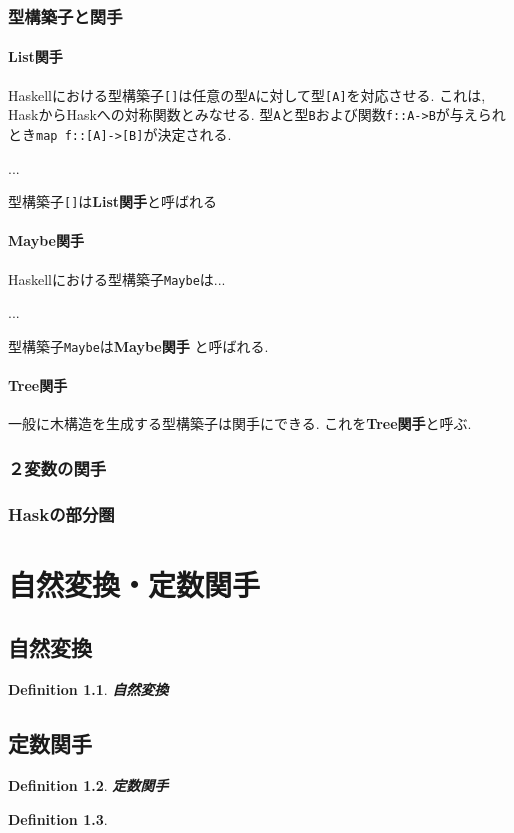 \documentclass{jsbook}
\theoremstyle{plain}
\newtheorem{Def}{Definition}[chapter]
\begin{document}
\subsection{型構築子と関手}
\subsubsection{List関手}
Haskellにおける型構築子\verb|[]|は任意の型\verb|A|に対して型\verb|[A]|を対応させる.
これは, HaskからHaskへの対称関数とみなせる.
型\verb|A|と型\verb|B|および関数\verb|f::A->B|が与えられとき\verb|map f::[A]->[B]|が決定される.

...

型構築子\verb|[]|は{\bf List関手}と呼ばれる
\subsubsection{Maybe関手}
Haskellにおける型構築子\verb|Maybe|は...

...

型構築子\verb|Maybe|は{\bf Maybe関手}
と呼ばれる.
\subsubsection{Tree関手}
一般に木構造を生成する型構築子は関手にできる. これを{\bf Tree関手}と呼ぶ.


\subsection{２変数の関手}
\subsection{Haskの部分圏}
\chapter{自然変換・定数関手}
\section{自然変換}
\begin{Def}
{\bf 自然変換}
\end{Def}
\section{定数関手}
\begin{Def}
{\bf 定数関手}
\end{Def}
\begin{Def}
\end{Def}
\end{document}
